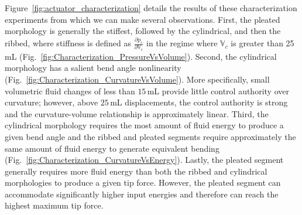 Figure~\ref{fig:actuator_characterization} details the results of these characterization experiments from which we can make several observations.
%
First, the pleated morphology is generally the stiffest, followed by the cylindrical, and then the ribbed, where stiffness is defined as $\frac{\partial p_c}{\partial \mathbb{V}_c}$ in the regime where $\mathbb{V}_c$ is greater than 25 mL (Fig.~\ref{fig:Characterization_PressureVsVolume}).
%
Second, the cylindrical morphology has a salient bend angle nonlinearity (Fig.~\ref{fig:Characterization_CurvatureVsVolume}).
%
More specifically, small volumetric fluid changes of less than $15\,$mL provide little control authority over curvature; however, above $25\,$mL displacements, the control authority is strong and the curvature-volume relationship is approximately linear.
%
Third, the cylindrical morphology requires the most amount of fluid energy to produce a given bend angle and the ribbed and pleated segments require approximately the same amount of fluid energy to generate equivalent bending (Fig.~\ref{fig:Characterization_CurvatureVsEnergy}).
%
Lastly, the pleated segment generally requires more fluid energy than both the ribbed and cylindrical morphologies to produce a given tip force.
%
However, the pleated segment can accommodate significantly higher input energies and therefore can reach the highest maximum tip force.
%